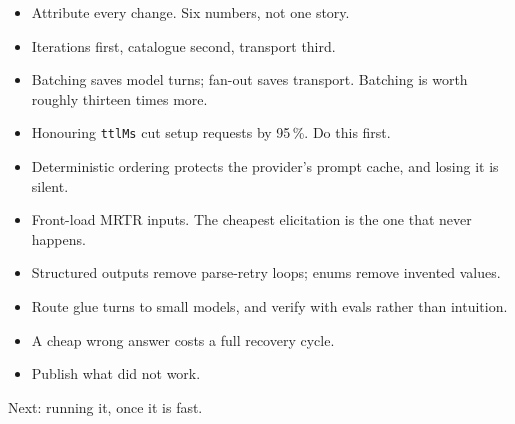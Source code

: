 \begin{itemize}[leftmargin=1.6em, itemsep=3pt]
\item Attribute every change. Six numbers, not one story.
\item Iterations first, catalogue second, transport third.
\item Batching saves model turns; fan-out saves transport. Batching is worth
roughly thirteen times more.
\item Honouring \texttt{ttlMs} cut setup requests by 95\,\%. Do this first.
\item Deterministic ordering protects the provider's prompt cache, and losing it
is silent.
\item Front-load MRTR inputs. The cheapest elicitation is the one that never
happens.
\item Structured outputs remove parse-retry loops; enums remove invented values.
\item Route glue turns to small models, and verify with evals rather than
intuition.
\item A cheap wrong answer costs a full recovery cycle.
\item Publish what did not work.
\end{itemize}

Next: running it, once it is fast.
